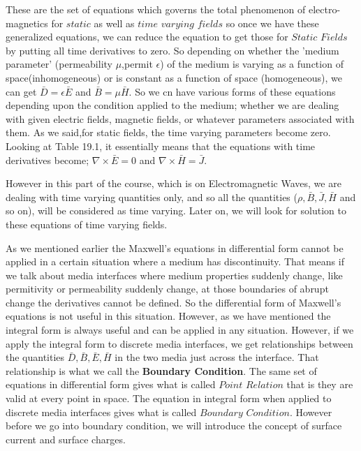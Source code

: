 These are the set of equations which governs the total phenomenon of electro-magnetics for $static$ as well as $time$ $varying$ $fields$ so once we have these generalized equations, we can reduce the equation to get those for $Static$ $Fields$ by putting all time derivatives to zero. So depending on whether the 'medium parameter' (permeability $\mu$,permit $\epsilon$) of the medium is varying as a function of space(inhomogeneous) or is constant as a function of space (homogeneous), we can get $\bar{D}=\epsilon\bar{E}$ and $\bar{B}=\mu\bar{H}$. So we cn have various forms of these equations depending upon the condition applied to the medium; whether we are dealing with given electric fields, magnetic fields, or whatever parameters associated with them. As we said,for static fields, the time varying parameters become zero. Looking at Table 19.1, it essentially means that the equations with time derivatives become; $\nabla\times\bar{E}=0$ and $\nabla\times\bar{H}=\bar{J}$.

However in this part of the course, which is on Electromagnetic Waves, we are dealing with time varying quantities only, and so all the quantities ($\rho,\bar{B},\bar{J},\bar{H}$ and so on), will be considered as time varying. Later on, we will look for solution to these equations of time varying fields.

As we mentioned earlier the Maxwell's equations in differential form cannot be applied in a certain situation where a medium has discontinuity. That means if we talk about media interfaces where medium properties suddenly change, like permitivity or permeability suddenly change, at those boundaries of abrupt change the derivatives cannot be defined. So the differential form of Maxwell's equations is not useful in this situation. However, as we have mentioned the integral form is always useful and can be applied in any situation. However, if we apply the integral form to discrete media interfaces, we get relationships between the quantities $\bar{D}, \bar{B}, \bar{E}, \bar{H}$ in the two media just across the interface. That relationship is what we call the \textbf{Boundary Condition}. The same set of equations in differential form gives what is called $Point$ $Relation$ that is they are valid at every point in space. The equation in integral form when applied to discrete media interfaces gives what is called $Boundary$ $Condition$. However before we go into boundary condition, we will introduce the concept of surface current and surface charges.

